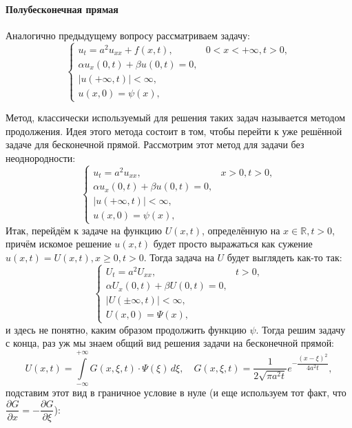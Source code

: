 

\paragraph{Полубесконечная прямая}
Аналогично предыдущему вопросу рассматриваем задачу:
\begin{equation}\label{1.10.2-main}
  \begin{cases}
    u_t = a^2 u_{xx} + f(x, t), &0 < x < +\infty, t > 0, \\
    \alpha u_x(0, t) + \beta u(0, t) = 0, \\
    |u(+\infty, t)| < \infty, \\
    u(x, 0) = \psi(x),
  \end{cases}
\end{equation}

Метод, классически используемый для решения таких задач называется методом продолжения. Идея этого
метода состоит в том, чтобы перейти к уже решённой задаче для бесконечной прямой. Рассмотрим этот
метод для задачи без неоднородности:
\[
  \begin{cases}
    u_t = a^2 u_{xx}, &x > 0, t > 0, \\
    \alpha u_x(0, t) + \beta u(0, t) = 0, \\
    |u(+\infty, t)| < \infty, \\
    u(x, 0) = \psi(x),
  \end{cases}
\]
Итак, перейдём к задаче на функцию $U(x, t)$, определённую на $x \in \mathbb{R}, t > 0$, причём
искомое решение $u(x, t)$ будет просто выражаться как сужение $u(x, t) = U(x, t), x\geqslant 0, t>0$.
Тогда задача на $U$ будет выглядеть как-то так:
\[
  \begin{cases}
    U_t = a^2 U_{xx}, &t > 0, \\
    \alpha U_x(0, t) + \beta U(0, t) = 0, \\
    |U(\pm \infty, t)| < \infty, \\
    U(x, 0) = \Psi(x),
  \end{cases}
\]
и здесь не понятно, каким образом продолжить функцию $\psi$. Тогда решим задачу с конца, раз уж мы
знаем общий вид решения задачи на бесконечной прямой:
\[
  U(x, t) = \int\limits_{-\infty}^{+\infty} G(x, \xi, t) \cdot \Psi(\xi) \, d\xi, \quad
  G(x, \xi, t) = \dfrac{1}{2\sqrt{\pi a^2 t}} e^{- \dfrac{(x-\xi)^2}{4 a^2 t}},
\]
подставим этот вид в граничное условие в нуле (и еще используем тот факт, что $\dfrac{\partial G}{\partial x} = - \dfrac{\partial G}{\partial \xi}$):
